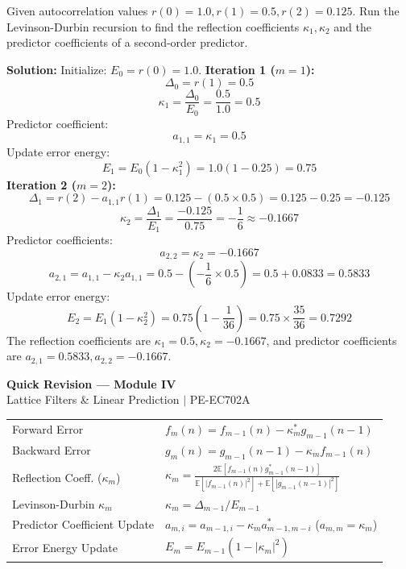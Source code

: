 \documentclass[12pt,a4paper]{article}
\renewcommand{\arraystretch}{1.45}
\begin{document}
\begin{tcolorbox}[examplebox, title={Example: Levinson-Durbin Recursion}]
Given autocorrelation values $r(0) = 1.0, r(1) = 0.5, r(2) = 0.125$. Run the Levinson-Durbin recursion to find the reflection coefficients $\kappa_1, \kappa_2$ and the predictor coefficients of a second-order predictor.

\textbf{Solution:}
Initialize: $E_0 = r(0) = 1.0$.
\textbf{Iteration 1 ($m=1$):}
\[
  \Delta_0 = r(1) = 0.5
\]
\[
  \kappa_1 = \frac{\Delta_0}{E_0} = \frac{0.5}{1.0} = 0.5
\]
Predictor coefficient:
\[
  a_{1,1} = \kappa_1 = 0.5
\]
Update error energy:
\[
  E_1 = E_0(1 - \kappa_1^2) = 1.0(1 - 0.25) = 0.75
\]
\textbf{Iteration 2 ($m=2$):}
\[
  \Delta_1 = r(2) - a_{1,1}r(1) = 0.125 - (0.5 \times 0.5) = 0.125 - 0.25 = -0.125
\]
\[
  \kappa_2 = \frac{\Delta_1}{E_1} = \frac{-0.125}{0.75} = -\frac{1}{6} \approx -0.1667
\]
Predictor coefficients:
\[
  a_{2,2} = \kappa_2 = -0.1667
\]
\[
  a_{2,1} = a_{1,1} - \kappa_2 a_{1,1} = 0.5 - \left(-\frac{1}{6} \times 0.5\right) = 0.5 + 0.0833 = 0.5833
\]
Update error energy:
\[
  E_2 = E_1(1 - \kappa_2^2) = 0.75 \left(1 - \frac{1}{36}\right) = 0.75 \times \frac{35}{36} = 0.7292
\]
The reflection coefficients are $\kappa_1 = 0.5, \kappa_2 = -0.1667$, and predictor coefficients are $a_{2,1} = 0.5833, a_{2,2} = -0.1667$.
\end{tcolorbox}

\newpage
\begin{center}
  {\large\bfseries\color{myred} Quick Revision --- Module IV}\\[3pt]
  {\small\color{mydark} Lattice Filters \& Linear Prediction $|$ PE-EC702A}
\end{center}
\noindent{\color{myred}\rule{\linewidth}{1.2pt}}
\vspace{4pt}

\begin{tcolorbox}[formulabox, title={\textbf{Key Formulas at a Glance}}]
\renewcommand{\arraystretch}{1.3}
\begin{tabularx}{\linewidth}{B{4.5cm} X}Forward Error & $f_m(n) = f_{m-1}(n) - \kappa_m^* g_{m-1}(n-1)$ \\[6pt]
Backward Error & $g_m(n) = g_{m-1}(n-1) - \kappa_m f_{m-1}(n)$ \\[6pt]
Reflection Coeff. ($\kappa_m$) & $\kappa_m = \frac{2\mathbb{E}[f_{m-1}(n) g_{m-1}^*(n-1)]}{\mathbb{E}[|f_{m-1}(n)|^2] + \mathbb{E}[|g_{m-1}(n-1)|^2]}$ \\[6pt]
Levinson-Durbin $\kappa_m$ & $\kappa_m = \Delta_{m-1}/E_{m-1}$ \\[6pt]
Predictor Coefficient Update & $a_{m, i} = a_{m-1, i} - \kappa_m a_{m-1, m-i}^*$ \quad ($a_{m,m} = \kappa_m$) \\[6pt]
Error Energy Update & $E_m = E_{m-1}(1 - |\kappa_m|^2)$
\end{tabularx}
\end{tcolorbox}
\end{document}
